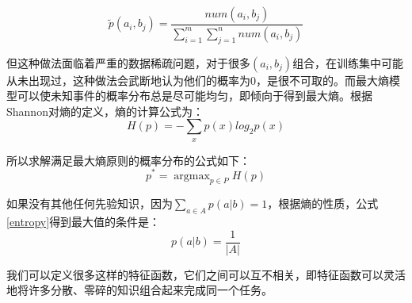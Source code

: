 \documentclass[master, winfont]{njuthesis}
\begin{document}
\begin{equation}
	\label{probability}
	\tilde{p}(a_i,b_j)=\frac{num(a_i,b_j)}{\sum_{i=1}^m\sum_{j=1}^n num(a_i, b_j)}
\end{equation}

但这种做法面临着严重的数据稀疏问题，对于很多$(a_i, b_j)$组合，在训练集中可能从未出现过，这种做法会武断地认为他们的概率为0，是很不可取的。而最大熵模型可以使未知事件的概率分布总是尽可能均匀，即倾向于得到最大熵。根据Shannon对熵的定义，熵的计算公式为：
\begin{equation}
	\label{entropy}
	H(p) = -\sum_{x} p(x)log_{2}p(x)
\end{equation}

所以求解满足最大熵原则的概率分布的公式如下：
\begin{equation}
	\label{entropy_2}
	p^* = \mathop{\arg\max}_{p∈P}H(p)
\end{equation}

如果没有其他任何先验知识，因为$\sum_{a\in A}p(a|b)=1$，根据熵的性质，公式\ref{entropy}得到最大值的条件是：
\begin{equation}
	\label{max_value}
	p(a | b) = \frac{1}{|A|}
\end{equation}


我们可以定义很多这样的特征函数，它们之间可以互不相关，即特征函数可以灵活地将许多分散、零碎的知识组合起来完成同一个任务。

\end{document}
